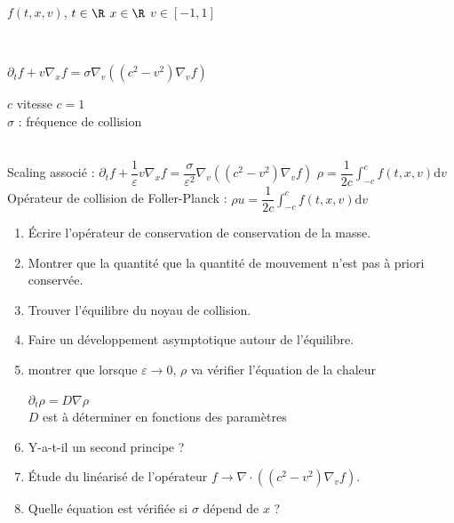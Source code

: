 \documentclass[12pt,a4paper]{article}
\begin{document}
	\begin{exo}
		\begin{minipage}[t]{18.5cm}
			$f(t,x,v)$, $t \in \R$ \hspace{.5cm} $x \in \R$ \hspace{.5cm} $v \in [-1, 1]$
		\end{minipage}\\
		
		\begin{minipage}{18cm}
			$\partial_t f + v \nabla_x f = \sigma \nabla_v((c^2-v^2)\nabla_v f)$ \hspace{.5cm} \begin{minipage}[t]{15cm}
			$c$  vitesse $c=1$\\
			$\sigma$ : fréquence de collision
		\end{minipage}\\
		
		Scaling associé : \hspace{.5cm} $\partial_t f + \dfrac1\varepsilon v \nabla_x f = \dfrac\sigma{\varepsilon^2}\nabla_v\left((c^2-v^2)\nabla_v f\right)$ \hspace{.5cm} $\rho = \dfrac1{2c} \displaystyle\int_{-c}^c f(t,x,v) \mathrm dv$\\
		Opérateur de collision de Foller-Planck : \hspace{.5cm} $\rho u = \dfrac1{2c}\displaystyle\int_{-c}^c f(t,x,v) \mathrm dv$
		
		\begin{enumerate}
			\item Écrire l'opérateur de conservation de conservation de la masse.
			
			\item Montrer que la quantité que la quantité de mouvement n'est pas à priori conservée.
			
			\item Trouver l'équilibre du noyau de collision.
			
			\item Faire un développement asymptotique autour de l'équilibre.
			
			\item montrer que lorsque $\varepsilon \to 0$, $\rho$ va vérifier l'équation de la chaleur \begin{minipage}[t]{4.5cm}
				 $\partial_t \rho  = D\nabla \rho$\\
				 $D$ est à déterminer en fonctions des paramètres
			\end{minipage}
			
			\item Y-a-t-il un second principe ?
			
			\item Étude du linéarisé de l'opérateur $f \to \nabla\cdot\left((c^2-v^2)\nabla_v f\right)$.
			
			\item Quelle équation est vérifiée si $\sigma$ dépend de $x$ ?
		\end{enumerate}
		\end{minipage}
	\end{exo}
\end{document}
